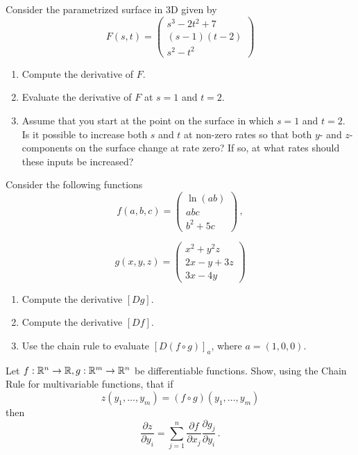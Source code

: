 \documentclass[12pt]{amsart}
\begin{document}
\begin{problem}
Consider the parametrized surface in 3D given by
\begin{equation*}
    F(s,t) =
    \begin{pmatrix}
        s^3 - 2t^2 + 7 \\
        (s-1)(t-2) \\
        s^2 - t^2
    \end{pmatrix}
\end{equation*}
\begin{enumerate}
    \item Compute the derivative of $F$.
    \item Evaluate the derivative of $F$ at $s = 1$ and $t = 2$.
    \item Assume that you start at the point on the surface in which $s = 1$ and $t = 2$. 
        Is it possible to increase both $s$ and $t$ at non-zero rates
        so that both $y$- and $z$- components on the surface change at rate zero?
        If so, at what rates should these inputs be increased?
\end{enumerate}
\end{problem}

\begin{problem}
    Consider the following functions
    \begin{equation*}
        f(a,b,c) = 
        \begin{pmatrix}
            \ln (ab) \\
            abc \\
            b^2 + 5c
        \end{pmatrix} \,,
    \end{equation*}

    \begin{equation*}
            g(x,y,z) = 
            \begin{pmatrix}
                x^2 + y^2 z \\
                2x - y + 3z \\
                3x - 4y
            \end{pmatrix}
    \end{equation*}
    \begin{enumerate}
        \item Compute the derivative $[Dg]$.
        \item Compute the derivative $[Df]$.
        \item Use the chain rule to evaluate $[D ( f\circ g)]_a$, where $a = (1, 0 , 0)$.
    \end{enumerate}
\end{problem}

\begin{problem}
Let $f: \mathbb{R}^n \to \mathbb{R}, g: \mathbb{R}^m \to \mathbb{R}^n$ be 
differentiable functions. 
Show, using the Chain Rule for multivariable functions, that if
$$z(y_1, \dots, y_m) = (f\circ g)(y_1, \dots, y_m)$$ 
then
\begin{equation*}
    \frac{\partial z}{\partial y_i} = \sum_{j=1}^n \frac{\partial f}{\partial x_j} \frac{\partial g_j}{\partial y_i} \,.
\end{equation*}
\end{problem}
\end{document}

